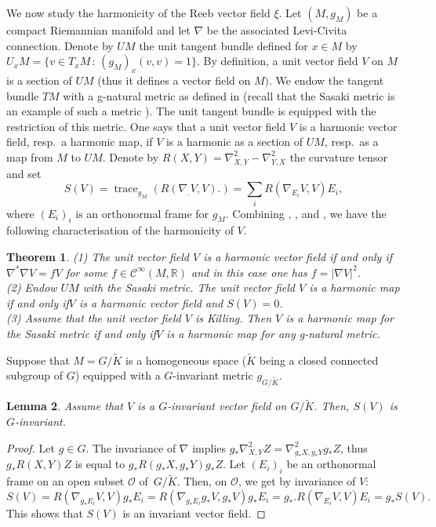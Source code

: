 \documentclass[a4paper,reqno]{amsart}
\newtheorem{thm}{Theorem}[section]
\newtheorem{lem}[thm]{Lemma}
\theoremstyle{definition}
\theoremstyle{remark}
\theoremstyle{plain}
\numberwithin{equation}{section}
\newcommand{\R}{{\mathbb{R}}}
\newcommand{\calC}{{\mathcal{C}}}
\newcommand{\calO}{{\mathcal{O}}}  \newcommand{\cO}{{\mathcal{O}}}
\DeclareMathOperator{\trace}{{trace}}
\newcommand{\Kt}{{\widetilde{K}}}
\newcommand{\wK}{{\widetilde{K}}}
\newcommand{\sissi}{if and only if\xspace}
\newcommand{\ddual}[2]{{\langle\langle {#1} ,  {#2} \rangle\rangle}}
\begin{document}
We now study the harmonicity of the Reeb vector field $\xi$.  Let
$(M,g_M)$ be a compact Riemannian manifold %
and let $\nabla$ be the associated Levi-Civita
connection. Denote by $UM$ the unit tangent bundle defined for
$x \in M$ by
$U_xM= \{ v \in T_xM \, : \,( g_M)_x(v,v) = 1\}$.  By
definition, a unit vector field $V$ on $M$ is a section of
$UM$ (thus it defines a vector field on $M)$.  We endow the
tangent bundle $TM$ with a g-natural metric as %
defined in \cite[5.1]{DP} (recall that the Sasaki metric is an
example of such a metric \cite[(5.6)]{DP}). The unit tangent
bundle is equipped with the restriction of this metric.  One
says that a unit vector field $V$ is a harmonic vector field,
resp.~a harmonic map, if $V$ is a harmonic as a section of
$UM$, resp.~as a map from $M$ to $UM$. Denote by
${R}(X,Y) %
= \nabla^2_{X,Y} - \nabla^2_{Y,X}$ the curvature tensor and set
\[
S(V) = \trace_{g_M} ({R}(\nabla_. V, V) .)=   %
\sum_i{R}(\nabla_{E_i} V, V)E_i,
\]
where $(E_i)_i$ is an orthonormal frame for $g_M$. Combining
\cite[Theorem 2]{ACP}, \cite[Lemma 7.1 \& Proposition~8.1]{Str},
\cite[Corollary 2 \& Proposition~3]{ACP} and \cite[page 85]{HY},
we have the following characterisation of the harmonicity of $V$.

\begin{thm}
  \label{thm6.18} \label{thm6.18a}
{\rm (1)}  The unit vector field $V$ is a harmonic vector field \sissi
  $\nabla^*\nabla V= f V$ for some $f \in \calC^\infty(M,\R)$ and
  in this case one has $f= |\nabla V|^2$.
  \\
    {\rm (2)} Endow $UM$ with the Sasaki metric.  The unit vector
  field $V$ is a harmonic map \sissi $V$ is a harmonic vector
  field and $S(V)=0$. 
  \\
  {\rm (3)} Assume that the unit vector field $V$ is Killing.
  Then $V$ is a harmonic map for the Sasaki metric \sissi $V$ is a
  harmonic map for any g-natural metric.
\end{thm}


Suppose that $M=G/\wK$ is a homogeneous space ($\wK$ being
a closed connected subgroup of $G$) equipped with a $G$-invariant metric $g_{\scriptscriptstyle{G/\wK}}$.

\begin{lem}
  \label{lem6.19}
  Assume that $V$ is a $G$-invariant vector field on $G/\Kt$. Then,
  $S(V)$ is $G$-invariant.
\end{lem}

\begin{proof}
  Let $g \in G$.  The invariance of $\nabla$ implies
  $g_*\nabla^2_{X,Y}Z= \nabla^2_{g_*X,g_*Y} g_*Z$, thus
  $g_* {R}(X,Y)Z$ is equal to  $g_*{R}(g_*X,g_*Y)g_*Z$.
  Let $(E_i)_i$ be an orthonormal frame on an open subset $\calO$
  of~$G/\Kt$.
    Then, on $\calO$, we get by invariance of $V$:
  \[
S(V) =
{R}(\nabla_{g_*E_i} V, V)g_*E_i = {R}(\nabla_{g_*E_i} g_*V,g_* V)g_*E_i
= g_*. {R}(\nabla_{E_i} V, V)E_i = g_* S(V).
\]
This shows that $S(V)$ is an invariant vector field. 
\end{proof}
\end{document}
